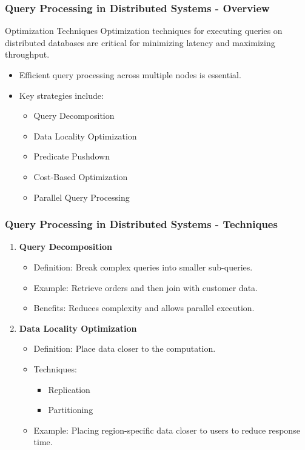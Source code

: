 \documentclass[aspectratio=169]{beamer}
\begin{document}
\begin{frame}[fragile]
    \frametitle{Query Processing in Distributed Systems - Overview}
    \begin{block}{Optimization Techniques}
        Optimization techniques for executing queries on distributed databases are critical for minimizing latency and maximizing throughput.
    \end{block}
    \begin{itemize}
        \item Efficient query processing across multiple nodes is essential.
        \item Key strategies include:
        \begin{itemize}
            \item Query Decomposition
            \item Data Locality Optimization
            \item Predicate Pushdown
            \item Cost-Based Optimization
            \item Parallel Query Processing
        \end{itemize}
    \end{itemize}
\end{frame}

\begin{frame}[fragile]
    \frametitle{Query Processing in Distributed Systems - Techniques}
    \begin{enumerate}
        \item \textbf{Query Decomposition}
            \begin{itemize}
                \item Definition: Break complex queries into smaller sub-queries.
                \item Example: Retrieve orders and then join with customer data.
                \item Benefits: Reduces complexity and allows parallel execution.
            \end{itemize}
        
        \item \textbf{Data Locality Optimization}
            \begin{itemize}
                \item Definition: Place data closer to the computation.
                \item Techniques: 
                  \begin{itemize}
                      \item Replication
                      \item Partitioning
                  \end{itemize}
                \item Example: Placing region-specific data closer to users to reduce response time.
            \end{itemize}
    \end{enumerate}
\end{frame}
\end{document}
